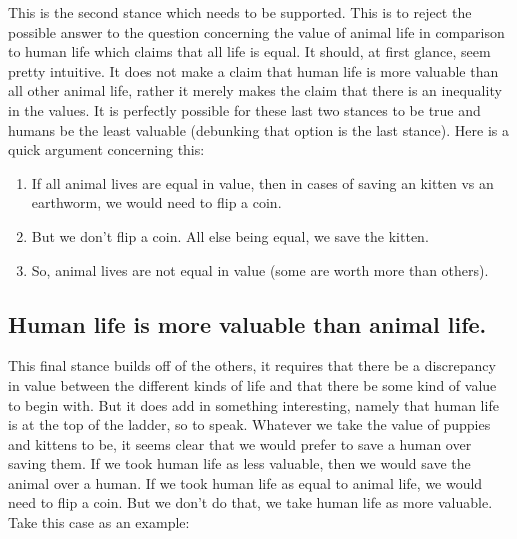 This is the second stance which needs to be supported. This is to reject the possible answer to the question concerning the value of animal life in comparison to human life which claims that all life is equal. It should, at first glance, seem pretty intuitive. It does not make a claim that human life is more valuable than all other animal life, rather it merely makes the claim that there is an inequality in the values. It is perfectly possible for these last two stances to be true and humans be the least valuable (debunking that option is the last stance). Here is a quick argument concerning this: 
\begin{enumerate}
    \item If all animal lives are equal in value, then in cases of saving an kitten vs an earthworm, we would need to flip a coin.
    \item But we don’t flip a coin. All else being equal, we save the kitten.
    \item So, animal lives are not equal in value (some are worth more than others).
\end{enumerate}


\subsection{Human life is more valuable than animal life.}

This final stance builds off of the others, it requires that there be a discrepancy in value between the different kinds of life and that there be some kind of value to begin with. But it does add in something interesting, namely that human life is at the top of the ladder, so to speak. Whatever we take the value of puppies and kittens to be, it seems clear that we would prefer to save a human over saving them. If we took human life as less valuable, then we would save the animal over a human. If we took human life as equal to animal life, we would need to flip a coin. But we don’t do that, we take human life as more valuable. Take this case as an example:



